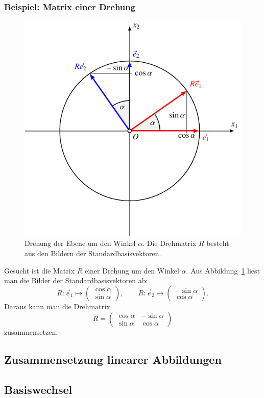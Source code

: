 \subsubsection{Beispiel: Matrix einer Drehung}
\begin{figure}
\centering
\includegraphics{3/images/drehung.pdf}
\caption{Drehung der Ebene um den Winkel $\alpha$.
Die Drehmatrix $R$ besteht aus den Bildern der Standardbasisvektoren.
\label{skript:affin:drehung}}
\end{figure}
Gesucht ist die Matrix $R$ einer Drehung um den Winkel $\alpha$.
Aus Abbildung~\ref{skript:affin:drehung} liest man die Bilder der
Standardbasisvektoren ab:
\[
R\colon \vec{e}_1 \mapsto \begin{pmatrix}\cos\alpha\\\sin\alpha\end{pmatrix},
\qquad
R\colon \vec{e}_2 \mapsto \begin{pmatrix}-\sin\alpha\\\cos\alpha\end{pmatrix}.
\]
Daraus kann man die Drehmatrix
\[
R=\begin{pmatrix}\cos\alpha&-\sin\alpha\\\sin\alpha&\cos\alpha\end{pmatrix}
\]
zusammensetzen.

%
%
\subsection{Zusammensetzung linearer Abbildungen}

%
%
\subsection{Basiswechsel}



